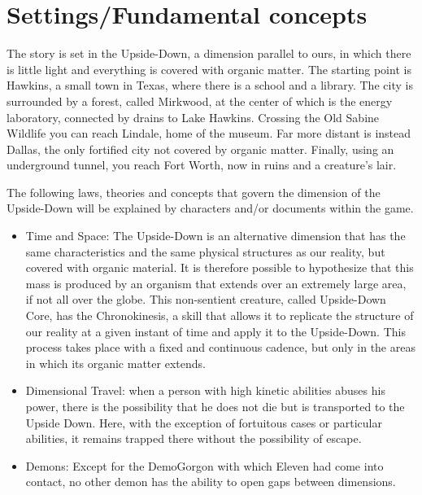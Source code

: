 \section{Settings/Fundamental concepts}
The story is set in the Upside-Down, a dimension parallel to ours, in which there is little light and everything is covered with organic matter.
The starting point is Hawkins, a small town in Texas, where there is a school and a library. The city is surrounded by a forest, called Mirkwood, at the center of which is the energy laboratory, connected by drains to Lake Hawkins. Crossing the Old Sabine Wildlife you can reach Lindale, home of the museum. Far more distant is instead Dallas, the only fortified city not covered by organic matter. Finally, using an underground tunnel, you reach Fort Worth, now in ruins and a creature's lair.

The following laws, theories and concepts that govern the dimension of the Upside-Down will be explained by characters and/or documents within the game.

\begin{itemize}
	\item Time and Space: The Upside-Down is an alternative dimension that has the same characteristics and the same physical structures as our reality, but covered with organic material. It is therefore possible to hypothesize that this mass is produced by an organism that extends over an extremely large area, if not all over the globe. This non-sentient creature, called Upside-Down Core, has the Chronokinesis, a skill that allows it to replicate the structure of our reality at a given instant of time and apply it to the Upside-Down. This process takes place with a fixed and 
	continuous cadence, but only in the areas in which its organic matter extends.
	\item Dimensional Travel: when a person with high kinetic abilities abuses his power, there is the possibility that he does not die but is transported to the Upside Down. Here, with the exception of fortuitous cases or particular abilities, it remains trapped there without the possibility of escape.
	\item Demons: Except for the DemoGorgon with which Eleven had come into contact, no other demon has the ability to open gaps between dimensions.
\end{itemize}

